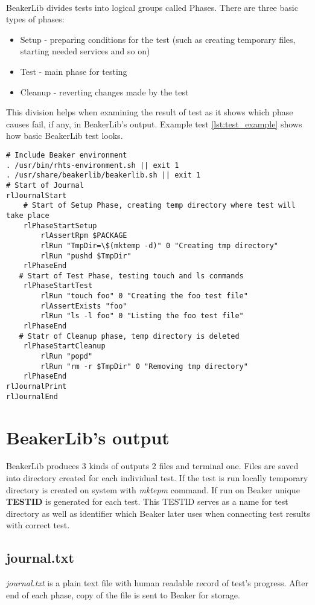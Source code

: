 ~\\
BeakerLib divides tests into logical groups called Phases. There are three basic types of phases:
\begin{itemize}
\item Setup - preparing conditions for the test (such as creating temporary files, starting needed services and so on)
\item Test - main phase for testing
\item Cleanup - reverting changes made by the test
\end{itemize}
This division helps when examining the result of test as it shows which phase causes fail, if any, in BeakerLib's output. Example test \ref{lst:test_example} shows how basic BeakerLib test looks.
\\
\begin{lstlisting}[style=beakerlib_bash,caption={BeakerLib basic test example},label={lst:test_example}]
# Include Beaker environment
. /usr/bin/rhts-environment.sh || exit 1
. /usr/share/beakerlib/beakerlib.sh || exit 1
# Start of Journal
rlJournalStart
    # Start of Setup Phase, creating temp directory where test will take place 
    rlPhaseStartSetup
        rlAssertRpm $PACKAGE
        rlRun "TmpDir=\$(mktemp -d)" 0 "Creating tmp directory"
        rlRun "pushd $TmpDir"
    rlPhaseEnd
   # Start of Test Phase, testing touch and ls commands
    rlPhaseStartTest
        rlRun "touch foo" 0 "Creating the foo test file"
        rlAssertExists "foo"
        rlRun "ls -l foo" 0 "Listing the foo test file"
    rlPhaseEnd
   # Statr of Cleanup phase, temp directory is deleted
    rlPhaseStartCleanup
        rlRun "popd"
        rlRun "rm -r $TmpDir" 0 "Removing tmp directory"
    rlPhaseEnd
rlJournalPrint
rlJournalEnd
\end{lstlisting}


\section{BeakerLib's output}
BeakerLib produces 3 kinds of outputs 2 files and terminal one. Files are saved into directory created for each individual test. If the test is run locally temporary directory is created on system with \textit{mktepm} command. If run on Beaker unique \textbf{TESTID} is generated for each test. This TESTID serves as a name for test directory as well as identifier which Beaker later uses when connecting test results with correct test.

\subsection{journal.txt}
\textit{journal.txt} is a plain text file with human readable record of test's progress. After end of each phase, copy of the file is sent to Beaker for storage.
